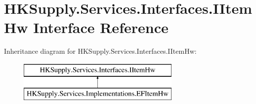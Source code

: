 \hypertarget{interface_h_k_supply_1_1_services_1_1_interfaces_1_1_i_item_hw}{}\section{H\+K\+Supply.\+Services.\+Interfaces.\+I\+Item\+Hw Interface Reference}
\label{interface_h_k_supply_1_1_services_1_1_interfaces_1_1_i_item_hw}
Inheritance diagram for H\+K\+Supply.\+Services.\+Interfaces.\+I\+Item\+Hw\+:\begin{figure}[H]
\begin{center}
\leavevmode
\includegraphics[height=2.000000cm]{interface_h_k_supply_1_1_services_1_1_interfaces_1_1_i_item_hw}
\end{center}
\end{figure}
